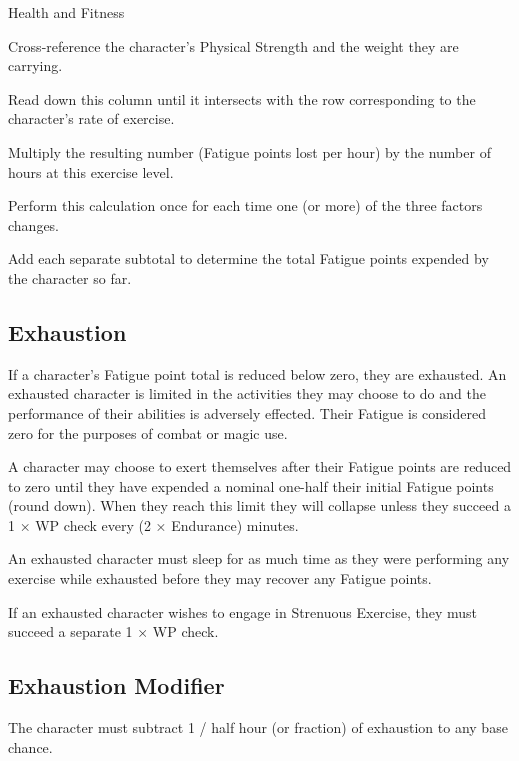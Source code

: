\begin{Chapter}{Health and Fitness}
\begin{Enumerate}

\item Cross-reference the character’s Physical Strength and the weight
  they are carrying.

\item Read down this column until it intersects with the row
  corresponding to the character’s rate of exercise.

\item Multiply the resulting number (Fatigue points lost per hour) by
  the number of hours at this exercise level.

\item Perform this calculation once for each time one (or more) of the
  three factors changes.

\item Add each separate subtotal to determine the total Fatigue points
  expended by the character so far.

\end{Enumerate}

\subsection{Exhaustion}

If a character’s Fatigue point total is reduced below zero, they are
exhausted. An exhausted character is limited in the activities they
may choose to do and the performance of their abilities is adversely
effected.  Their Fatigue is considered zero for the purposes of
combat or magic use.

A character may choose to exert themselves after their Fatigue points
are reduced to zero until they have expended a nominal one-half their
initial Fatigue points (round down). When they reach this limit they
will collapse unless they succeed a 1 × WP check every (2 × Endurance)
minutes.

An exhausted character must sleep for as much time as they were
performing any exercise while exhausted before they may recover any
Fatigue points.

If an exhausted character wishes to engage in Strenuous Exercise, they
must succeed a separate 1 × WP check.

\subsection{Exhaustion Modifier}

The character must subtract 1 / half hour (or fraction) of exhaustion
to any base chance.



\end{Chapter}
